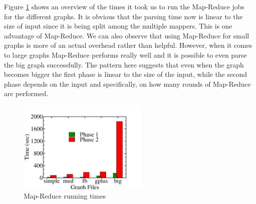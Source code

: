 Figure \ref{fig:mapreduce_graph} shows an overview of the times it took us to run the Map-Reduce jobs for the different graphs. It is obvious that the parsing time now is linear to the size of input since it is being split among the multiple mappers. This is one advantage of Map-Reduce. We can also observe that using Map-Reduce for small graphs is more of an actual overhead rather than helpful. However, when it comes to large graphs Map-Reduce performs really well and it is possible to even parse the big graph successfully. The pattern here suggests that even when the graph becomes bigger the first phase is linear to the size of the input, while the second phase depends on the input and specifically, on how many rounds of Map-Reduce are performed.

\begin{figure}[!h]
 \centering
    \includegraphics[width=15pc]{figures/mapreduce_graph}
	\caption{Map-Reduce running times}
    \label{fig:mapreduce_graph}
\end{figure}

